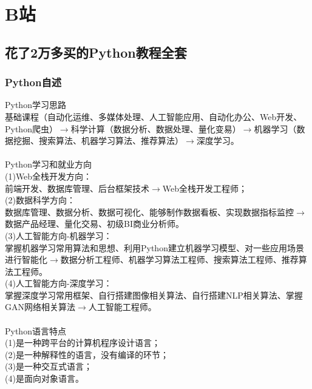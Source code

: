 \documentclass{book}%
\begin{document}
\part{B站}

\chapter{花了2万多买的Python教程全套}

\section{Python自述}

{\heiti Python学习思路}\\
基础课程（自动化运维、多媒体处理、人工智能应用、自动化办公、Web开发、Python爬虫）$\longrightarrow$科学计算（数据分析、数据处理、量化变易）$\longrightarrow$机器学习（数据挖掘、搜索算法、机器学习算法、推荐算法）$\longrightarrow$深度学习。\\
~\\

{\heiti Python学习和就业方向}\\
(1)Web全栈开发方向：\\
前端开发、数据库管理、后台框架技术$\longrightarrow$Web全栈开发工程师；\\
(2)数据科学方向：\\
数据库管理、数据分析、数据可视化、能够制作数据看板、实现数据指标监控$\longrightarrow$数据产品经理、量化交易、初级BI商业分析师。\\
(3)人工智能方向-机器学习：\\
掌握机器学习常用算法和思想、利用Python建立机器学习模型、对一些应用场景进行智能化$\longrightarrow$数据分析工程师、机器学习算法工程师、搜索算法工程师、推荐算法工程师。\\
(4)人工智能方向-深度学习：\\
掌握深度学习常用框架、自行搭建图像相关算法、自行搭建NLP相关算法、掌握GAN网络相关算法$\longrightarrow$人工智能工程师。\\
~\\

{\heiti Python语言特点}\\
(1)是一种跨平台的计算机程序设计语言；\\
(2)是一种解释性的语言，没有编译的环节；\\
(3)是一种交互式语言；\\
(4)是面向对象语言。\\
~\\
\end{document}
